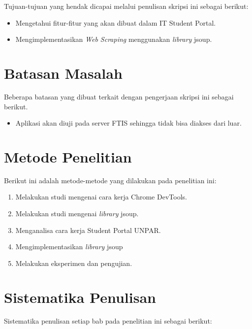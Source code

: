 Tujuan-tujuan yang hendak dicapai melalui penulisan skripsi ini sebagai berikut:
\begin{itemize}
	\item	Mengetahui fitur-fitur yang akan dibuat dalam IT Student Portal.
	\item	Mengimplementasikan \textit{Web Scraping} menggunakan \textit{library} jsoup.
\end{itemize}

\section{Batasan Masalah}
\label{sec:batasan_masalah}

Beberapa batasan yang dibuat terkait dengan pengerjaan skripsi ini sebagai berikut.
\begin{itemize}
	\item Aplikasi akan diuji pada server FTIS sehingga tidak bisa diakses dari luar.
\end{itemize}

\section{Metode Penelitian}
\label{sec:metode_penelitian}

Berikut ini adalah metode-metode yang dilakukan pada penelitian ini:

\begin{enumerate}
	\item Melakukan studi mengenai cara kerja Chrome DevTools.
  \item Melakukan studi mengenai \textit{library} jsoup.
	\item Menganalisa cara kerja Student Portal UNPAR.
	\item Mengimplementasikan \textit{library} jsoup
	\item Melakukan eksperimen dan pengujian.
\end{enumerate}

\section{Sistematika Penulisan}
\label{sec:sistematika_penulisan}

Sistematika penulisan setiap bab pada penelitian ini sebagai berikut:

